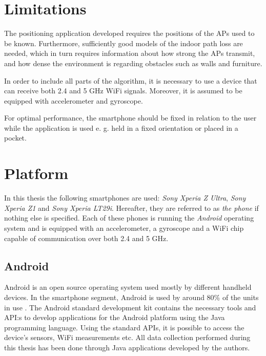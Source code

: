 \documentclass{LTHthesis}
\begin{document}
\section{Limitations}
%
The positioning application developed requires the positions of the APs used to be known. Furthermore, sufficiently good models of the indoor path loss are needed, which in turn requires information about how strong the APs transmit, and how dense the environment is regarding obstacles such as walls and furniture. 

In order to include all parts of the algorithm, it is necessary to use a device that can receive both 2.4 and 5 GHz WiFi signals. Moreover, it is assumed to be equipped with accelerometer and gyroscope.

For optimal performance, the smartphone should be fixed in relation to the user while the application is used e. g. held in a fixed orientation or placed in a pocket. 

%
\section{Platform}

%
In this thesis the following smartphones are used: \emph{Sony Xperia Z Ultra}, \emph{Sony Xperia Z1} and \emph{Sony Xperia LT29i}. Hereafter, they are referred to as \emph{the phone} if nothing else is specified. Each of these phones is running the \emph{Android} operating system and is equipped with an accelerometer, a gyroscope and a WiFi chip capable of communication over both 2.4 and 5 GHz.
%
\subsection{Android} 
%
Android is an open source operating system used mostly by different handheld devices. In the smartphone segment, Android is used by around 80\% of the units in use \cite{android}. The Android standard development kit contains the necessary tools and API:s to develop applications for the Android platform using the Java programming language. Using the standard APIs, it is possible to access the device's sensors, WiFi measurements etc. All data collection performed during this thesis has been done through Java applications developed by the authors. 
%
\end{document}
